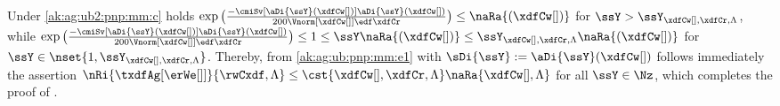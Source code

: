 \begin{pro} Under
  \ref{ak:ag:ub2:pnp:mm:c} holds  
  $\exp\big(\tfrac{-\cmiSv[\aDi{\ssY}({\xdfCw[]})]\aDi{\ssY}({\xdfCw[]})}{200\Vnorm[{\xdfCw[]}]{\edf}\xdfCr}\big)\leq
  \naRa{(\xdfCw[])}$  for $\ssY> \ssY_{\xdfCw[],\xdfCr,\Lambda}$, while 
  $\exp\big(\tfrac{-\cmiSv[\aDi{\ssY}({\xdfCw[]})]\aDi{\ssY}({\xdfCw[]})}{200\Vnorm[{\xdfCw[]}]{\edf}\xdfCr}\big)\leq1\leq
  \ssY\naRa{(\xdfCw[])}\leq \ssY_{\xdfCw[],\xdfCr,\Lambda}
  \naRa{{(\xdfCw[])}}$ for $\ssY\in\nset{1,\ssY_{\xdfCw[],\xdfCr,\Lambda}}$. Thereby, from
  \eqref{ak:ag:ub:pnp:mm:e1} with $\sDi{\ssY}:=\aDi{\ssY}({\xdfCw[]})$
  follows immediately the assertion
    $\nRi{\txdfAg[{\erWe[]}]}{\rwCxdf,\Lambda}
    \leq \cst{\xdfCw[],\xdfCr,\Lambda} \naRa{\xdfCw[],\Lambda}$ for all
    $\ssY\in\Nz$, which  completes the
proof of .\proEnd\end{pro}